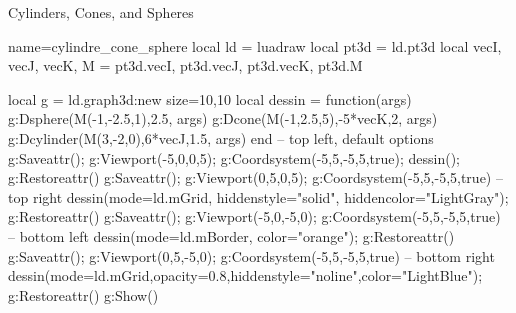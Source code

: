\begin{demo}{Cylinders, Cones, and Spheres}
\begin{luadraw}{name=cylindre_cone_sphere}
local ld = luadraw
local pt3d = ld.pt3d
local vecI, vecJ, vecK, M = pt3d.vecI, pt3d.vecJ, pt3d.vecK, pt3d.M

local g = ld.graph3d:new{ size={10,10} }
local dessin = function(args)
    g:Dsphere(M(-1,-2.5,1),2.5, args)
    g:Dcone(M(-1,2.5,5),-5*vecK,2, args)
    g:Dcylinder(M(3,-2,0),6*vecJ,1.5, args)
end
-- top left, default options
g:Saveattr(); g:Viewport(-5,0,0,5); g:Coordsystem(-5,5,-5,5,true); dessin(); g:Restoreattr()
g:Saveattr(); g:Viewport(0,5,0,5); g:Coordsystem(-5,5,-5,5,true) 
-- top right
dessin({mode=ld.mGrid, hiddenstyle="solid", hiddencolor="LightGray"}); g:Restoreattr()
g:Saveattr(); g:Viewport(-5,0,-5,0); g:Coordsystem(-5,5,-5,5,true) 
-- bottom left
dessin({mode=ld.mBorder, color="orange"}); g:Restoreattr()
g:Saveattr(); g:Viewport(0,5,-5,0); g:Coordsystem(-5,5,-5,5,true) 
-- bottom right
dessin({mode=ld.mGrid,opacity=0.8,hiddenstyle="noline",color="LightBlue"}); g:Restoreattr()
g:Show()
\end{luadraw}
\end{demo}
